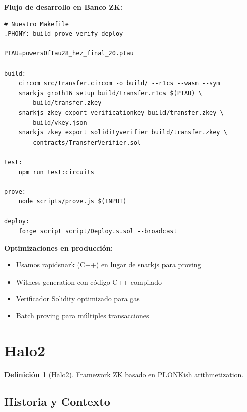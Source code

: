 \documentclass[11pt,a4paper,twoside,openright]{book}
\theoremstyle{definition}
\newtheorem{definition}{Definición}[chapter]
\theoremstyle{plain}
\theoremstyle{remark}
\begin{document}
\begin{bancozk}
\textbf{Flujo de desarrollo en Banco ZK:}

\begin{verbatim}
# Nuestro Makefile
.PHONY: build prove verify deploy

PTAU=powersOfTau28_hez_final_20.ptau

build:
    circom src/transfer.circom -o build/ --r1cs --wasm --sym
    snarkjs groth16 setup build/transfer.r1cs $(PTAU) \
        build/transfer.zkey
    snarkjs zkey export verificationkey build/transfer.zkey \
        build/vkey.json
    snarkjs zkey export solidityverifier build/transfer.zkey \
        contracts/TransferVerifier.sol

test:
    npm run test:circuits

prove:
    node scripts/prove.js $(INPUT)

deploy:
    forge script script/Deploy.s.sol --broadcast
\end{verbatim}

\textbf{Optimizaciones en producción:}
\begin{itemize}
    \item Usamos rapidsnark (C++) en lugar de snarkjs para proving
    \item Witness generation con código C++ compilado
    \item Verificador Solidity optimizado para gas
    \item Batch proving para múltiples transacciones
\end{itemize}
\end{bancozk}


\section{Halo2}

\begin{definition}[Halo2]
Framework ZK basado en PLONKish arithmetization.
\end{definition}

\subsection{Historia y Contexto}
\end{document}
